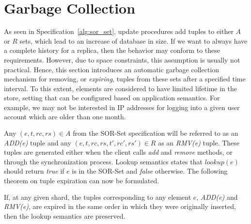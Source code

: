\section{Garbage Collection}
\label{sec:garbage_collection}

As seen in Specification~\ref{alg:sor_set}, update procedures add tuples to
either $A$ or $R$ sets, which lead to an increase of database in size. If we
want to always have a complete history for a replica, then the behavior may
conform to these requirements. However, due to space constraints, this
assumption is usually not practical. Hence, this section introduces an automatic
garbage collection mechanism for removing, or \textit{expiring}, tuples from
these sets after a specified time interval. To this extent, elements are
considered to have limited lifetime in the store, setting that can be configured
based on application semantics. For example, we may not be interested in IP
addresses for logging into a given user account which are older than one month.

Any $(e, t, rc, rs) \in A$ from the SOR-Set specification will be referred to as
an \textit{ADD(e)} tuple and any $(e, t, rc, rs, t', rc', rs') \in R$ as an
\textit{RMV(e)} tuple. These tuples are generated either when the client calls
\textit{add} and \textit{remove} methods, or through the synchronization
process. Lookup semantics states that $\textit{lookup}(e)$ should return
\textit{true} if $e$ is in the SOR-Set and \textit{false} otherwise. The
following theorem on tuple expiration can now be formulated.

\begin{theorem}
\begin{itshape}
If, at any given shard, the tuples corresponding to any element $e$,
\textit{ADD(e)} and \textit{RMV(e)}, are expired in the same order in which they
were originally inserted, then the lookup semantics are preserved.
\end{itshape}
\end{theorem}

